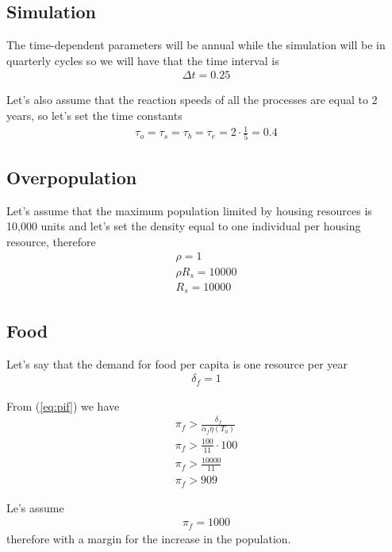 \documentclass[a4paper,twoside]{article}
\begin{document}
\subsection{Simulation}

The time-dependent parameters will be annual while the simulation will be in quarterly cycles so we will have that the time interval is
\begin{align*}
	\Delta t = 0.25
\end{align*}

Let's also assume that the reaction speeds of all the processes are equal to 2 years, so let's set the time constants
\begin{align*}
	\tau_o = \tau_s = \tau_b = \tau_e = 2 \cdot \frac{1}{5} = 0.4
\end{align*}

\subsection{Overpopulation}

Let's assume that the maximum population limited by housing resources is 10,000 units and let's set the density equal to one individual per housing resource, therefore
\begin{align*}
	\rho = 1
	\\
	\rho R_s = 10000
	\\
	R_s = 10000
\end{align*}

\subsection{Food}

Let's say that the demand for food per capita is one resource per year
\begin{align*}
	\delta_f = 1
\end{align*}

From (\ref{eq:pif}) we have
\begin{align*}
	\pi_f > \frac{\delta_f}{ \alpha_f \eta(T_0)}
	\\
	\pi_f > \frac{100}{11} \cdot 100
	\\
	\pi_f > \frac{10000}{11}
	\\
	\pi_f > 909
\end{align*}

Le's assume
\begin{align*}
	\pi_f = 1000
\end{align*}
therefore with a margin for the increase in the population.
\end{document}
